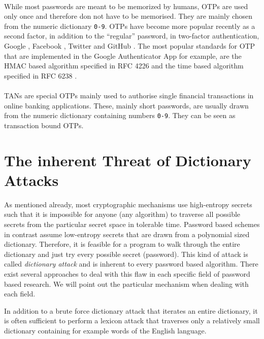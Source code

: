 \paragraph{}
While most passwords are meant to be memorized by humans, \acp{OTP} are used only once and therefore don not have to be memorised.
They are mainly chosen from the numeric dictionary \texttt{0-9}.
\acp{OTP} have become more popular recently as a second factor, in addition to the ``regular'' password, in two-factor authentication, \eg Google \cite{Google2Factor}, Facebook \cite{FB2Factor}, Twitter \cite{Twitter2Factor} and GitHub \cite{Github2Factor}.
The most popular standards for \ac{OTP} that are implemented in the Google Authenticator App \cite{GAuthenticator} for example, are the \acs{HMAC} based algorithm specified in RFC 4226 \cite{rfc4226} and the time based algorithm specified in RFC 6238 \cite{rfc6238}.

\paragraph{}
\acp{TAN} are special \acp{OTP} mainly used to authorise single financial transactions in online banking applications.
These, mainly short passwords, are usually drawn from the numeric dictionary containing numbers \texttt{0-9}.
They can be seen as transaction bound \acp{OTP}.

\section{The inherent Threat of Dictionary Attacks}\label{sec:introdictionaryattacks}
As mentioned already, most cryptographic mechanisms use high-entropy secrets such that it is impossible for anyone (any algorithm) to traverse all possible secrets from the particular secret space in tolerable time.
Password based schemes in contrast assume low-entropy secrets that are drawn from a polynomial sized dictionary.
Therefore, it is feasible for a program to walk through the entire dictionary and just try every possible secret (password).
This kind of attack is called \emph{dictionary attack} and is inherent to every password based algorithm.
There exist several approaches to deal with this flaw in each specific field of password based research.
We will point out the particular mechanism when dealing with each field.

In addition to a brute force dictionary attack that iterates an entire dictionary, it is often sufficient to perform a lexicon attack that traverses only a relatively small dictionary containing for example words of the English language.

